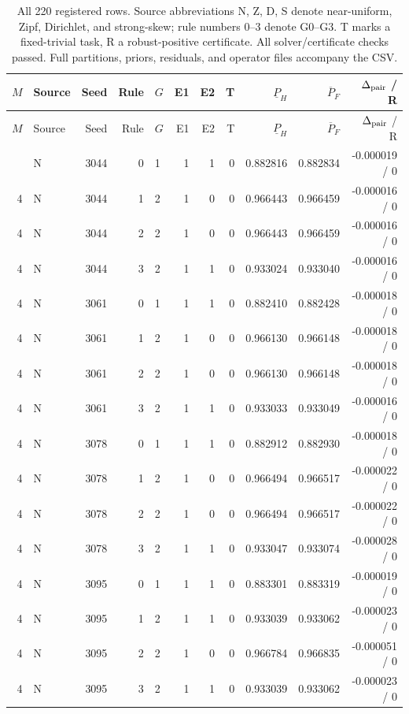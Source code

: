 \begin{longtable}{@{}rlrrlrrrrrr@{}}
\caption{All 220 registered rows. Source abbreviations N, Z, D, S denote near-uniform, Zipf, Dirichlet, and strong-skew; rule numbers 0--3 denote G0--G3. T marks a fixed-trivial task, R a robust-positive certificate. All solver/certificate checks passed. Full partitions, priors, residuals, and operator files accompany the CSV.}\label{tab:allrows}\\
\toprule $M$ & Source & Seed & Rule & $G$ & E1 & E2 & T & $\underline P_H$ & $\overline P_F$ & $\Delta_{\rm pair}$ / R \\ \midrule\endfirsthead
\toprule $M$ & Source & Seed & Rule & $G$ & E1 & E2 & T & $\underline P_H$ & $\overline P_F$ & $\Delta_{\rm pair}$ / R \\ \midrule\endhead
\bottomrule\endfoot
4 & N & 3044 & 0 & 1 & 1 & 1 & 0 & 0.882816 & 0.882834 & -0.000019 / 0 \\
4 & N & 3044 & 1 & 2 & 1 & 0 & 0 & 0.966443 & 0.966459 & -0.000016 / 0 \\
4 & N & 3044 & 2 & 2 & 1 & 0 & 0 & 0.966443 & 0.966459 & -0.000016 / 0 \\
4 & N & 3044 & 3 & 2 & 1 & 1 & 0 & 0.933024 & 0.933040 & -0.000016 / 0 \\
4 & N & 3061 & 0 & 1 & 1 & 1 & 0 & 0.882410 & 0.882428 & -0.000018 / 0 \\
4 & N & 3061 & 1 & 2 & 1 & 0 & 0 & 0.966130 & 0.966148 & -0.000018 / 0 \\
4 & N & 3061 & 2 & 2 & 1 & 0 & 0 & 0.966130 & 0.966148 & -0.000018 / 0 \\
4 & N & 3061 & 3 & 2 & 1 & 1 & 0 & 0.933033 & 0.933049 & -0.000016 / 0 \\
4 & N & 3078 & 0 & 1 & 1 & 1 & 0 & 0.882912 & 0.882930 & -0.000018 / 0 \\
4 & N & 3078 & 1 & 2 & 1 & 0 & 0 & 0.966494 & 0.966517 & -0.000022 / 0 \\
4 & N & 3078 & 2 & 2 & 1 & 0 & 0 & 0.966494 & 0.966517 & -0.000022 / 0 \\
4 & N & 3078 & 3 & 2 & 1 & 1 & 0 & 0.933047 & 0.933074 & -0.000028 / 0 \\
4 & N & 3095 & 0 & 1 & 1 & 1 & 0 & 0.883301 & 0.883319 & -0.000019 / 0 \\
4 & N & 3095 & 1 & 2 & 1 & 1 & 0 & 0.933039 & 0.933062 & -0.000023 / 0 \\
4 & N & 3095 & 2 & 2 & 1 & 0 & 0 & 0.966784 & 0.966835 & -0.000051 / 0 \\
4 & N & 3095 & 3 & 2 & 1 & 1 & 0 & 0.933039 & 0.933062 & -0.000023 / 0 \\

\end{longtable}
